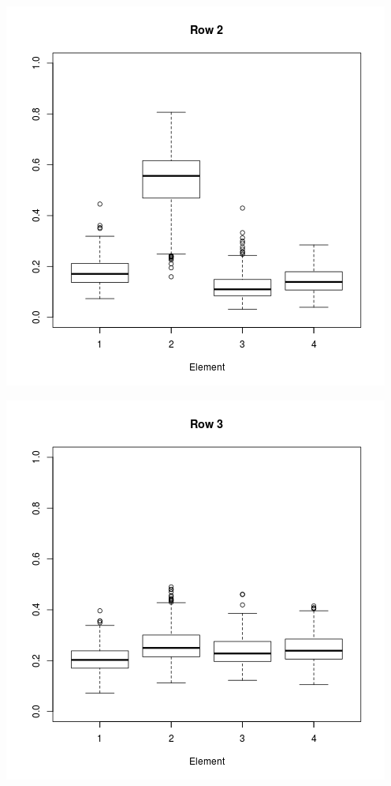 \documentclass[11pt,a4paper]{report}
\begin{document}
\begin{center}
\includegraphics[scale=0.6]{row2.png}
\end{center}
\begin{center}
\includegraphics[scale=0.6]{row3.png}
\end{center}
\end{document}
